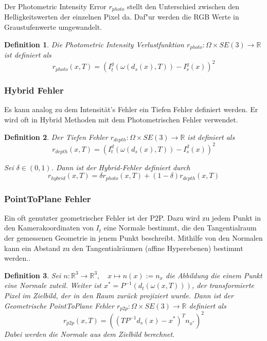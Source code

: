 \documentclass[12pt,DIV=15,BCOR=15mm,twoside,headsepline,abstract=true,listof=totoc,bibliography=totoc]{scrreprt}
\newtheorem{defi}{Definition}
\theoremstyle{remark}    %
\begin{document}
    Der Photometric Intensity Error $r_{photo}$ stellt den Unterschied zwischen den Helligkeitswerten der einzelnen Pixel da. Daf"ur werden die RGB Werte
    in Graustufenwerte umgewandelt.
    \begin{defi}
        Die Photometric Intensity Verlustfunktion $r_{photo}:\Omega \times SE(3) \to \mathbb{R}$ ist definiert als 
        \[
        r_{photo}(x, T) = ( I_t^g(\omega(d_s(x), T)) - I_s^g(x))^2
        \]

    \end{defi} \cite{Park_2017_ICCV,steinbruecker2011real}

    \subsubsection{Hybrid Fehler}
    Es kann analog zu dem Intensität's Fehler ein Tiefen Fehler definiert werden. Er wird oft in Hybrid Methoden mit dem Photometrischen Fehler verwendet. 
    \begin{defi}
        Der Tiefen Fehler $r_{depth}:\Omega \times SE(3) \to \mathbb{R}$ ist definiert als
        \[
            r_{depth}(x,T)= (I_t^d(\omega(d_s(x), T)) - I_s^d(x))^2
        \]

        Sei $\delta \in (0,1)$. Dann ist der Hybrid-Fehler definiert durch 
        \[
            r_{hybrid}(x,T)= \delta r_{photo}(x, T) + (1-\delta)r_{depth}(x,T)
        \]
    \end{defi} 
    
    \subsubsection{PointToPlane Fehler}
    Ein oft genutzter geometrischer Fehler ist der \ac{P2P}.
    Dazu wird zu jedem Punkt in den Kamerakoordinaten von $I_t$ eine Normale bestimmt, die den Tangentialraum der gemessenen Geometrie in jenem Punkt
    beschreibt. Mithilfe von den Normalen kann ein Abstand zu den Tangentialräumen (affine Hyperebenen) bestimmt werden.\cite{Park_2017_ICCV, Zhou2018}.
    \begin{defi}
        Sei $n:\mathbb{R}^3 \to \mathbb{R}^3, \hspace{1em} x \mapsto n(x):= n_x$ die Abbildung die einem Punkt eine Normale zuteil. 
        Weiter ist $x^* = P^{-1}(d_t(\omega(x, T)))$, der transformierte Pixel im Zielbild, der in den Raum zurück 
        projiziert wurde. Dann ist der Geometrische PointToPlane Fehler 
        $r_{p2p}:\Omega \times SE(3) \to \mathbb{R}$ definiert als
        \[
            r_{p2p}(x,T)= ((TP^{-1}d_s(x) - x^*)^Tn_{x^*})^2
        \]
        Dabei werden die Normale aus dem Zielbild berechnet.
    \end{defi}
\end{document}
